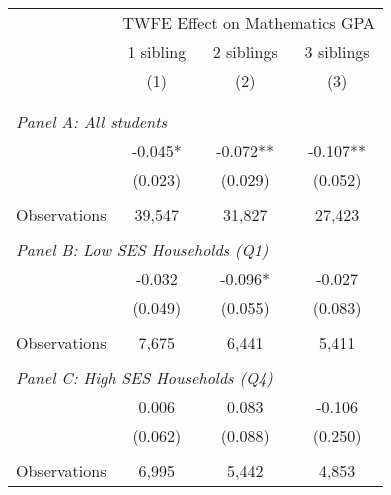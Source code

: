 \makeatletter
{}
{
\makeatother
\begin{tabular}{lccc}
\toprule
\cmidrule(lr){2-4}
& \multicolumn{3}{c}{TWFE Effect on Mathematics GPA} \\
\cmidrule(lr){2-4}
& 1 sibling & 2 siblings & 3 siblings  \\
\cmidrule(lr){2-2} \cmidrule(lr){3-3} \cmidrule(lr){4-4}
& (1) & (2) & (3)\\
\bottomrule
&  &  &  \\
&  &  &   \\
\multicolumn{4}{l}{\textit{Panel A: All students}} \\
\hspace{3mm}        &      -0.045*  &      -0.072** &      -0.107** \\
                    &     (0.023)   &     (0.029)   &     (0.052)   \\
                    &               &               &               \\
\hspace{3mm}Observations&      39,547   &      31,827   &      27,423   \\
 
&  &  &   \\
\multicolumn{4}{l}{\textit{Panel B: Low SES Households (Q1)}} \\
\hspace{3mm}        &      -0.032   &      -0.096*  &      -0.027   \\
                    &     (0.049)   &     (0.055)   &     (0.083)   \\
                    &               &               &               \\
\hspace{3mm}Observations&       7,675   &       6,441   &       5,411   \\
 
&  &  &   \\
\multicolumn{4}{l}{\textit{Panel C: High SES Households (Q4)}} \\
\hspace{3mm}        &       0.006   &       0.083   &      -0.106   \\
                    &     (0.062)   &     (0.088)   &     (0.250)   \\
                    &               &               &               \\
\hspace{3mm}Observations&       6,995   &       5,442   &       4,853   \\
 

\end{tabular}}
